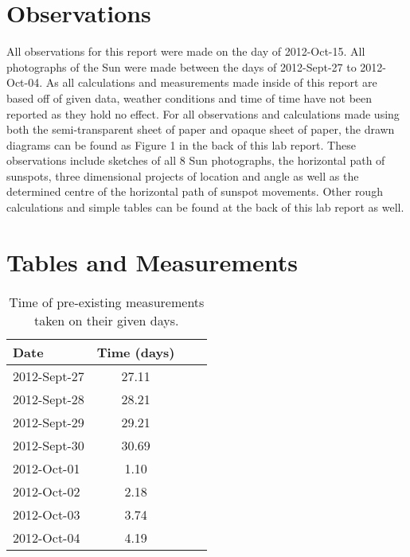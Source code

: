 \documentclass{article}
\begin{document}
\section{Observations}

All observations for this report were made on the day of 2012-Oct-15. All photographs of the Sun were made between the
days of 2012-Sept-27 to 2012-Oct-04. As all calculations and measurements made inside of this report are based off of
given data, weather conditions and time of time have not been reported as they hold no effect. For all observations and
calculations made using both the semi-transparent sheet of paper and opaque sheet of paper, the drawn diagrams
can be found as Figure 1 in the back of this lab report. These observations include sketches of all 8 Sun photographs, 
the horizontal path of sunspots, three dimensional projects of location and angle as well as the determined centre of
the horizontal path of sunspot movements. Other rough calculations and simple tables can be found at the back
of this lab report as well.


\section{Tables and Measurements}
\label{sec:tnm}

\begin{table}[h!]
\begin{center}
\begin{tabular}{l c c c}
\hline
Date & Time (days) \\
\hline
\hline
2012-Sept-27 & 27.11 \\
2012-Sept-28 & 28.21 \\
2012-Sept-29 & 29.21 \\
2012-Sept-30 & 30.69 \\
2012-Oct-01 & 1.10 \\
2012-Oct-02 & 2.18 \\
2012-Oct-03 & 3.74 \\
2012-Oct-04 & 4.19 \\
\hline
\end{tabular}
\end{center}
\caption{Time of pre-existing measurements taken on their given days.\label{tab:time}}
\end{table}
\end{document}
